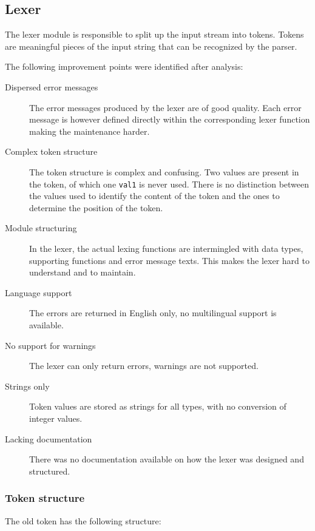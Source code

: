 
\subsection{Lexer}
\label{analysis:lexer}
The lexer module is responsible to split up the input stream into tokens.
Tokens are meaningful pieces of the input string that can be recognized by the parser.

The following improvement points were identified after analysis:
\begin{description}
  \item[Dispersed error messages]
    The error messages produced by the lexer are of good quality.
    Each error message is however defined directly within the corresponding lexer function making the maintenance harder.
  \item[Complex token structure]
    The token structure is complex and confusing.
    Two values are present in the token, of which one \texttt{val1} is never used.
    There is no distinction between the values used to identify the content of the token and the ones to determine the position of the token.
  \item[Module structuring]
    In the lexer, the actual lexing functions are intermingled with data types, supporting functions and error message texts.
    This makes the lexer hard to understand and to maintain.
  \item[Language support]
    The errors are returned in English only, no multilingual support is available.
  \item[No support for warnings]
    The lexer can only return errors, warnings are not supported. 
  \item[Strings only]
    Token values are stored as strings for all types, with no conversion of integer values.
  \item[Lacking documentation]
    There was no documentation available on how the lexer was designed and structured.
\end{description}


\subsubsection{Token structure}
The old token has the following structure:

